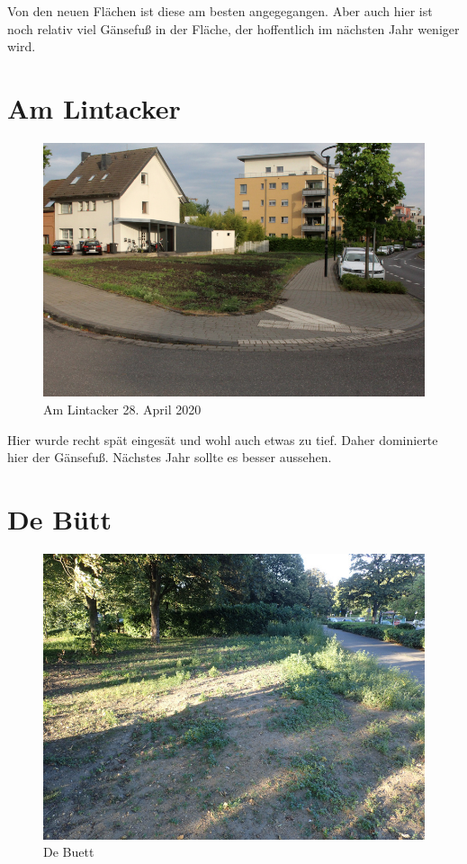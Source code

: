 \documentclass[10pt]{article}
\begin{document}
Von den neuen Flächen ist diese am besten angegegangen. Aber auch hier ist noch relativ viel Gänsefuß in der Fläche, der hoffentlich im nächsten Jahr weniger wird.

\clearpage
\section{Am Lintacker}
\begin{figure}[h!]
  \includegraphics[width=\linewidth]{img/lintacker/april.jpg}
  \caption{Am Lintacker 28. April 2020}
\end{figure}

Hier wurde recht spät eingesät und wohl auch etwas zu tief. Daher dominierte hier der Gänsefuß.
Nächstes Jahr sollte es besser aussehen.

\clearpage
\section{De Bütt}
\begin{figure}[h!]
  \includegraphics[width=\linewidth]{img/buett/juli.jpg}
  \caption{De Buett}
\end{figure}
\end{document}

